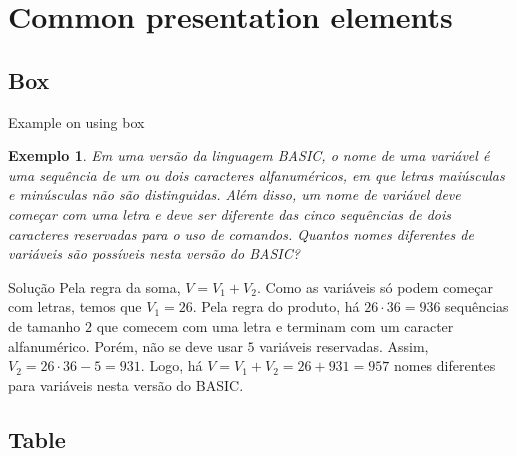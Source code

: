 \documentclass[aspectratio=169,t,xcolor=table]{beamer}
\newtheorem{ex}{Exemplo}
\begin{document}
    



    \section{Common presentation elements}

    \subsection{Box}

    \begin{frame}{Example on using box}

        \footnotesize

        \begin{ex}
            Em uma versão da linguagem BASIC, o nome de uma variável é uma sequência de um ou dois caracteres alfanuméricos, em que letras maiúsculas e minúsculas não são distinguidas. Além disso, um nome de variável deve começar com uma letra e deve ser diferente das cinco sequências de dois caracteres reservadas para o uso de comandos. Quantos nomes diferentes de variáveis são possíveis nesta versão do BASIC?
        \end{ex}

        \begin{block}{Solução}
            Pela regra da soma, $V=V_1+V_2$. Como as variáveis só podem começar com letras, temos que $V_1=26$. Pela regra do produto, há $26\cdot 36=936$ sequências de tamanho $2$ que comecem com uma letra e terminam com um caracter alfanumérico. Porém, não se deve usar $5$ variáveis reservadas. Assim, $V_2=26\cdot 36-5=931$. Logo, há $V=V_1+V_2 = 26+931=957$ nomes diferentes para variáveis nesta versão do BASIC.
        \end{block}

    \end{frame}



    \subsection{Table}
\end{document}
